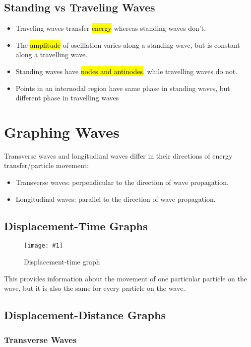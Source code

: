 \documentclass[a4paper,12pt]{article}
\let\oldsection\section
\renewcommand\section{\clearpage\oldsection}
\newcommand{\img}[4]{\begin{center}
  \begin{figure}[H]
    \centering
    \texttt{[image: \#1]}
    \caption{#3}
    \label{fig:#4}
  \end{figure}
\end{center}}
\begin{document}
\subsection{Standing vs Traveling Waves}

\begin{itemize}
  \item Traveling waves transfer \hl{energy} whereas standing waves don't.
  \item The \hl{amplitude} of oscillation varies along a standing wave, but is constant along a travelling wave.
  \item Standing waves have \hl{nodes and antinodes}, while travelling waves do not.
  \item Points in an internodal region have same phase in standing waves, but different phase in travelling waves
\end{itemize}

\section{Graphing Waves}

Transverse waves and longitudinal waves differ in their directions of energy transfer/particle movement:
\begin{itemize}
  \item Transverse waves: perpendicular to the direction of wave propagation.
  \item Longitudinal waves: parallel to the direction of wave propagation.
\end{itemize}

\subsection{Displacement-Time Graphs}

\img{distancetime.png}{0.9}{Displacement-time graph}{distancetime}

This provides information about the movement of one particular particle on the wave, but it is also the same for every particle on the wave.


\subsection{Displacement-Distance Graphs}

\subsubsection{Transverse Waves}
\end{document}
